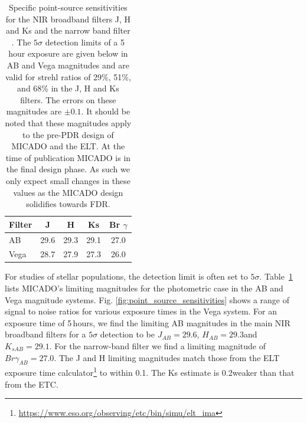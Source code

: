 \begin{table}

    \centering
    \caption{Specific point-source sensitivities for the NIR broadband filters J, H and Ks and the narrow band filter \brgamma. The $5\sigma$ detection limits of a 5 hour exposure are given below in AB and Vega magnitudes and are valid for strehl ratios of 29\%, 51\%, and 68\% in the J, H and Ks filters. The errors on these magnitudes are $\pm 0.1$\m. It should be noted that these magnitudes apply to the pre-PDR design of MICADO and the ELT. At the time of publication MICADO is in the final design phase. As such we only expect small changes in these values as the MICADO design solidifies towards FDR.}
    \label{tbl:micado_point_source_sensitivities}

    \begin{tabular}{ l | c c c c }
        \hline\hline
Filter          & J         & H        & Ks         & Br $\gamma$   \\
        \hline                
    AB          & 29.6\m    & 29.3\m   & 29.1\m     & 27.0\m        \\
        \hline                
    Vega        & 28.7\m    & 27.9\m   & 27.3\m     & 26.0\m        \\
        \hline                
    \end{tabular}

\end{table}


For studies of stellar populations, the detection limit is often set to $5\sigma$.
Table~\ref{tbl:micado_point_source_sensitivities} lists MICADO's limiting magnitudes for the photometric case in the AB and Vega magnitude systems. Fig. \ref{fig:point_source_sensitivities} shows a range of signal to noise ratios for various exposure times in the Vega system. For an exposure time of 5\,hours, we find the limiting AB magnitudes in the main NIR broadband filters for a $5\sigma$ detection to be $J_{AB}=29.6$\m, $H_{AB}=29.3$\m and $K_{s  AB}=29.1$\m. For the narrow-band filter \brgamma we find a limiting magnitude of $Br\gamma_{AB}=27.0$\m. The J and H limiting magnitudes match those from the ELT exposure time calculator\footnote{\url{https://www.eso.org/observing/etc/bin/simu/elt_ima}} to within 0.1\m. The Ks estimate is 0.2\m weaker than that from the ETC.

